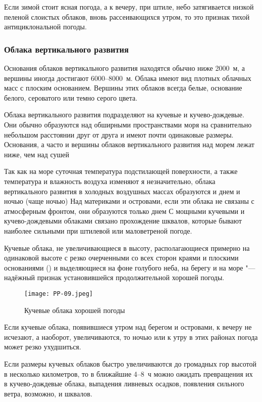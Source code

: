  Если зимой стоит ясная погода, а к вечеру, при штиле, небо
затягивается низкой пеленой слоистых облаков, вновь рассеивающихся
утром, то это признак тихой антициклональной погоды.

\subsubsection{Облака вертикального развития}

Основания облаков вертикального развития находятся обычно ниже 2000~м,
а вершины иногда достигают 6000--8000~м. Облака имеют вид плотных
облачных масс с плоским основанием. Вершины этих облаков всегда белые,
основание белого, сероватого или темно серого цвета.

Облака вертикального развития подразделяют на кучевые и
кучево-дождевые. Они обычно образуются над обширными пространствами
моря на сравнительно небольшом расстоянии друг от друга и имеют почти
одинаковые размеры. Основания, а часто и вершины облаков вертикального
развития над морем лежат ниже, чем над сушей

Так как на море суточная температура подстилающей поверхности, а также
температура и влажность воздуха изменяют я незначительно, облака
вертикального развития в холодных воздушных массах образуются и днем и
ночью (чаще ночью) Над материками и островами, если эти облака не
связаны с атмосферным фронтом, они образуются только днем С мощными
кучевыми и кучево-дождевыми облаками связано прохождение шквалов,
которые бывают наиболее сильными при штилевой или маловетреной погоде.

 Кучевые облака, не увеличивающиеся в высоту, располагающиеся
примерно на одинаковой высоте с резко очерченными со всех сторон
краями и плоскими основаниями () и выделяющиеся на фоне
голубого неба, на берегу и на море "--- надёжный признак установившейся
продолжительной хорошей погоды.

\begin{figure}[htb]
  \centering{}
  \texttt{[image: PP-09.jpeg]}
  \caption{Кучевые облака хорошей погоды}
  \label{fig:pp09}
  \small
  \centering{}
\end{figure}

 Если кучевые облака, появившиеся утром над берегом и островами,
к вечеру не исчезают, а наоборот, увеличиваются, то ночью или к утру в
этих районах погода может резко ухудшиться.

 Если размеры кучевых облаков быстро увеличиваются до громадных
гор высотой в несколько километров, то в ближайшие 4--8~ч можно ожидать
превращения их в кучево-дождевые облака, выпадения ливневых осадков,
появления сильного ветра, возможно, и шквалов.

